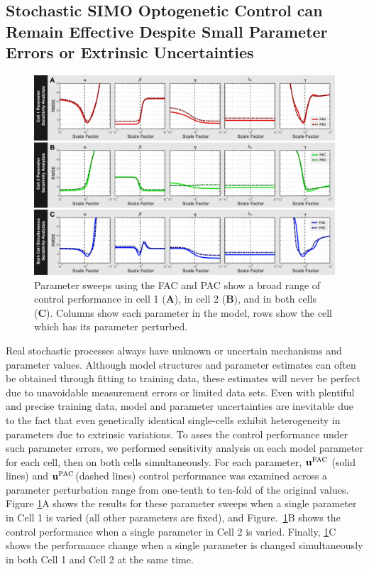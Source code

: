 \documentclass[12pt]{iopart}
\begin{document}
 \subsection{Stochastic SIMO Optogenetic Control can Remain Effective Despite Small Parameter Errors or Extrinsic Uncertainties}\label{sec:ResPars}
\begin{figure}
\begin{center}
\includegraphics[width=1\textwidth]{ParameterPerturbation.pdf}
\caption{Parameter sweeps using the FAC and PAC show a broad range of control performance in cell 1 ({\bf A}),  in cell 2 ({\bf B}), and in both cells ({\bf C}). Columns show each parameter in the model, rows show the cell which has its parameter perturbed. }
\label{Parameter}
\end{center}
\end{figure}

Real stochastic processes always have unknown or uncertain mechanisms and parameter values. Although model structures and parameter estimates can often be obtained through fitting to training data, these estimates will never be perfect due to unavoidable measurement errors or limited data sets. 
Even with plentiful and precise training data, model and parameter uncertainties are inevitable due to the fact that even genetically identical single-cells exhibit heterogeneity in parameters due to extrinsic variations.
To asses the control performance under such parameter errors, we performed sensitivity analysis on each model parameter for each cell, then on both cells simultaneously. 
For each parameter, $\mathbf{u}^{\rm FAC}$ (solid lines) and $\mathbf{u}^{\rm PAC}$(dashed lines) control performance was examined across a parameter perturbation range from one-tenth to ten-fold of the original values.
Figure \ref{Parameter}A shows the results for these parameter sweeps when a single parameter in Cell 1 is varied (all other parameters are fixed), and Figure.\ \ref{Parameter}B shows the control performance when a single parameter in Cell 2 is varied. 
Finally, \ref{Parameter}C shows the performance change when a single parameter is changed simultaneously in both Cell 1 and Cell 2 at the same time.
\end{document}
